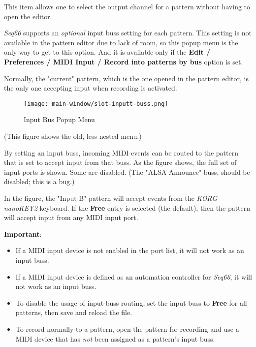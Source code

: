    This item allows one to select the output channel for a pattern without
   having to open the editor.

   \textsl{Seq66} supports an
   \textsl{optional} input buss setting for each pattern.
   This setting is not available in the pattern editor due to lack
   of room, so this popup menu is the only way to get to this option.
   And it is available only if the
   \textbf{Edit / Preferences / MIDI Input / Record into patterns by
   bus} option is set.

   Normally, the "current" pattern, which is the one opened in
   the pattern editor, is the only one accepting input when
   recording is activated.

\begin{figure}[H]
   \centering 
   \texttt{[image: main-window/slot-inputt-buss.png]}
   \caption{Input Bus Popup Menu}
   \label{fig:slot_input_bus}
\end{figure}

   (This figure shows the old, less nested menu.)

   By setting an input buss, incoming MIDI events can be routed to
   the pattern that is set to accept input from that buss.
   As the figure shows, the full set of input ports is shown.
   Some are disabled. (The "ALSA Announce" buss, should be disabled; this
   is a bug.)

   In the figure, the "Input B" pattern will accept events from
   the \textsl{KORG nanoKEY2} keyboard.
   If the \textbf{Free} entry is selected (the default), then
   the pattern will accept input from any MIDI input port.

   \textbf{Important}:
   \begin{itemize}
      \item If a MIDI input device is not enabled in the port list,
         it will not work as an input buss.
      \item If a MIDI input device is defined as an automation controller for
         \textsl{Seq66}, it will not work as an input buss.
      \item To disable the usage of input-buss routing, set the input buss
         to \textbf{Free} for all patterns, then save and reload the file.
      \item To record normally to a pattern, open the pattern for recording
         and use a MIDI device that has \textsl{not} been assigned as
         a pattern's input buss.
   \end{itemize}

